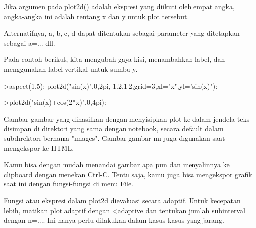 \documentclass[a4paper,10pt]{article}
\begin{document}
\begin{eulernotebook}
\begin{eulercomment}
\begin{eulercomment}
\begin{eulercomment}
\begin{eulercomment}
\begin{eulercomment}
\begin{eulercomment}
\begin{eulercomment}
\begin{eulercomment}
\begin{eulercomment}
\begin{eulercomment}
\begin{eulercomment}
\begin{eulercomment}
\begin{eulercomment}
\begin{eulercomment}
\begin{eulercomment}
\begin{eulercomment}
\begin{eulercomment}
\begin{eulercomment}
\begin{eulercomment}
\begin{eulercomment}
\begin{eulercomment}
\begin{eulercomment}
\begin{eulercomment}
\begin{eulercomment}
\begin{eulercomment}
\begin{eulercomment}
\begin{eulercomment}
\begin{eulercomment}
\begin{eulercomment}
\begin{eulercomment}
\begin{eulercomment}
\begin{eulercomment}
\begin{eulercomment}
\begin{eulercomment}
\begin{eulercomment}
\begin{eulercomment}
\begin{eulercomment}
Jika argumen pada plot2d() adalah ekspresi yang diikuti oleh empat
angka, angka-angka ini adalah rentang x dan y untuk plot tersebut.

Alternatifnya, a, b, c, d dapat ditentukan sebagai parameter yang
ditetapkan sebagai a=... dll.

Pada contoh berikut, kita mengubah gaya kisi, menambahkan label, dan
menggunakan label vertikal untuk sumbu y.
\end{eulercomment}
\begin{eulerprompt}
>aspect(1.5); plot2d("sin(x)",0,2pi,-1.2,1.2,grid=3,xl="x",yl="sin(x)"):
\end{eulerprompt}
\begin{eulerprompt}
>plot2d("sin(x)+cos(2*x)",0,4pi):
\end{eulerprompt}
\begin{eulercomment}
Gambar-gambar yang dihasilkan dengan menyisipkan plot ke dalam jendela
teks disimpan di direktori yang sama dengan notebook, secara default
dalam subdirektori bernama "images". Gambar-gambar ini juga digunakan
saat mengekspor ke HTML.

Kamu bisa dengan mudah menandai gambar apa pun dan menyalinnya ke
clipboard dengan menekan Ctrl-C. Tentu saja, kamu juga bisa mengekspor
grafik saat ini dengan fungsi-fungsi di menu File.

Fungsi atau ekspresi dalam plot2d dievaluasi secara adaptif. Untuk
kecepatan lebih, matikan plot adaptif dengan \textless{}adaptive dan tentukan
jumlah subinterval dengan n=.... Ini hanya perlu dilakukan dalam
kasus-kasus yang jarang.


\end{eulercomment}
\end{eulercomment}
\end{eulercomment}
\end{eulercomment}
\end{eulercomment}
\end{eulercomment}
\end{eulercomment}
\end{eulercomment}
\end{eulercomment}
\end{eulercomment}
\end{eulercomment}
\end{eulercomment}
\end{eulercomment}
\end{eulercomment}
\end{eulercomment}
\end{eulercomment}
\end{eulercomment}
\end{eulercomment}
\end{eulercomment}
\end{eulercomment}
\end{eulercomment}
\end{eulercomment}
\end{eulercomment}
\end{eulercomment}
\end{eulercomment}
\end{eulercomment}
\end{eulercomment}
\end{eulercomment}
\end{eulercomment}
\end{eulercomment}
\end{eulercomment}
\end{eulercomment}
\end{eulercomment}
\end{eulercomment}
\end{eulercomment}
\end{eulercomment}
\end{eulercomment}
\end{eulernotebook}
\end{document}

